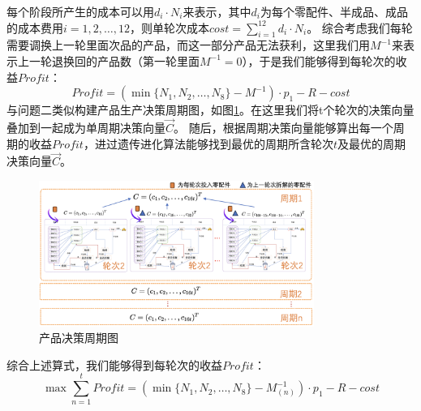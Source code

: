 \documentclass[withoutpreface,bwprint]{cumcmthesis} %
\begin{document}
每个阶段所产生的成本可以用$d_{i}\cdot N_{i}$来表示，其中$d_{i}$为每个零配件、半成品、成品的成本费用$i=1,2,\dots,12$，则单轮次成本$cost = \sum_{i=1}^{12}d_{i}\cdot N_{i}$。
		综合考虑我们每轮需要调换上一轮里面次品的产品，而这一部分产品无法获利，这里我们用$M^{-1}$来表示上一轮退换回的产品数（第一轮里面$M^{-1}=0$），于是我们能够得到每轮次的收益$Profit$：
		\begin{equation}
			\textit{Profit}=(\min \{N_{1},N_{2},\dots,N_{8}\}-M^{-1})\cdot p_{1}-R-cost
			\label{eq:12}
		\end{equation}
		与问题二类似构建产品生产决策周期图，如图\ref{fig:pro3-2}。在这里我们将t个轮次的决策向量叠加到一起成为单周期决策向量$\vec{C}$。
		随后，根据周期决策向量能够算出每一个周期的收益$Profit$，进过遗传进化算法能够找到最优的周期所含轮次$t$及最优的周期决策向量$\vec{C}$。
		\begin{figure}[H]
			\centering
			\includegraphics[width=0.8\textwidth]{Fig/pro3-2.png}
			\caption{产品决策周期图}
			\label{fig:pro3-2}
		\end{figure}
		综合上述算式，我们能够得到每轮次的收益$Profit$：
$$\max	\sum_{n=1}^{t}\textit{Profit}=(\min \{N_{1},N_{2},\dots,N_{8}\}-M_{(n)}^{-1})\cdot p_{1}-R-cost$$
\end{document}
